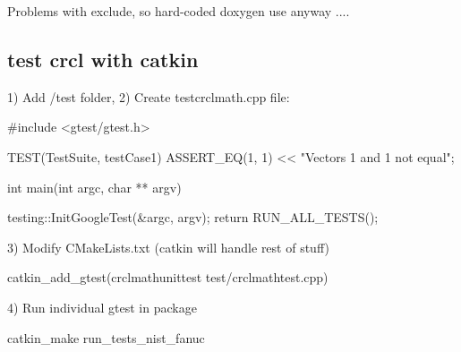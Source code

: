 Problems with exclude, so hard-\/coded doxygen use anyway ....

\subsection*{test crcl with catkin }

1) Add /test folder, 2) Create testcrclmath.\-cpp file\-: \begin{DoxyVerb}#include <gtest/gtest.h>

TEST(TestSuite, testCase1) {
    ASSERT_EQ(1, 1) << "Vectors 1 and 1 not equal";
}

int main(int argc, char ** argv) {

    testing::InitGoogleTest(&argc, argv);
    return RUN_ALL_TESTS();
}
\end{DoxyVerb}


3) Modify C\-Make\-Lists.\-txt (catkin will handle rest of stuff) \begin{DoxyVerb}catkin_add_gtest(crclmathunittest test/crclmathtest.cpp)
\end{DoxyVerb}


4) Run individual gtest in package \begin{DoxyVerb}catkin_make run_tests_nist_fanuc\end{DoxyVerb}
 